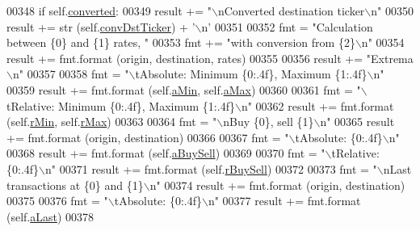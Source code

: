 \begin{DoxyCode}
{{00348         \textcolor{keywordflow}{if} self.\hyperlink{classexchange_1_1_diff_tracker_a3dac3e23c410307f41327725701fbd10}{converted}:
00349             result += \textcolor{stringliteral}{"\(\backslash\)nConverted destination ticker\(\backslash\)n"}
00350             result += str (self.\hyperlink{classexchange_1_1_diff_tracker_a8eb45d1c936bc32a5732d59a387265dc}{convDstTicker}) + \textcolor{stringliteral}{'\(\backslash\)n'}
00351         
00352         fmt     = \textcolor{stringliteral}{"Calculation between \{0\} and \{1\} rates, "}
00353         fmt    += \textcolor{stringliteral}{"with conversion from \{2\}\(\backslash\)n"}
00354         result += fmt.format (origin, destination, rates)
00355         
00356         result += \textcolor{stringliteral}{"Extrema\(\backslash\)n"}
00357         
00358         fmt = \textcolor{stringliteral}{"\(\backslash\)tAbsolute: Minimum \{0:.4f\}, Maximum \{1:.4f\}\(\backslash\)n"}
00359         result += fmt.format (self.\hyperlink{classexchange_1_1_diff_tracker_a65d042348359fa27a17e092e66405ae7}{aMin}, self.\hyperlink{classexchange_1_1_diff_tracker_a3dcbc689ebb5ec6e0c8e600079d95de9}{aMax})
00360         
00361         fmt = \textcolor{stringliteral}{"\(\backslash\)tRelative: Minimum \{0:.4f\}, Maximum \{1:.4f\}\(\backslash\)n"}
00362         result += fmt.format (self.\hyperlink{classexchange_1_1_diff_tracker_ad3250cb94933244444942dec9199d362}{rMin}, self.\hyperlink{classexchange_1_1_diff_tracker_ab4266c6d4fc968997e26044a7c827980}{rMax})
00363         
00364         fmt = \textcolor{stringliteral}{"\(\backslash\)nBuy \{0\}, sell \{1\}\(\backslash\)n"}
00365         result += fmt.format (origin, destination)
00366         
00367         fmt = \textcolor{stringliteral}{"\(\backslash\)tAbsolute: \{0:.4f\}\(\backslash\)n"}
00368         result += fmt.format (self.\hyperlink{classexchange_1_1_diff_tracker_ae6108d1ec0cdf3b195ed5bb7c8b529b2}{aBuySell})
00369         
00370         fmt = \textcolor{stringliteral}{"\(\backslash\)tRelative: \{0:.4f\}\(\backslash\)n"}
00371         result += fmt.format (self.\hyperlink{classexchange_1_1_diff_tracker_aab406fe7b4dc6d486c4a9fb65944a4df}{rBuySell})
00372         
00373         fmt = \textcolor{stringliteral}{"\(\backslash\)nLast transactions at \{0\} and \{1\}\(\backslash\)n"}
00374         result += fmt.format (origin, destination)
00375         
00376         fmt = \textcolor{stringliteral}{"\(\backslash\)tAbsolute: \{0:.4f\}\(\backslash\)n"}
00377         result += fmt.format (self.\hyperlink{classexchange_1_1_diff_tracker_ae428ab91ae6471c4ad8b566540fb035e}{aLast})
00378         
}}
\end{DoxyCode}
